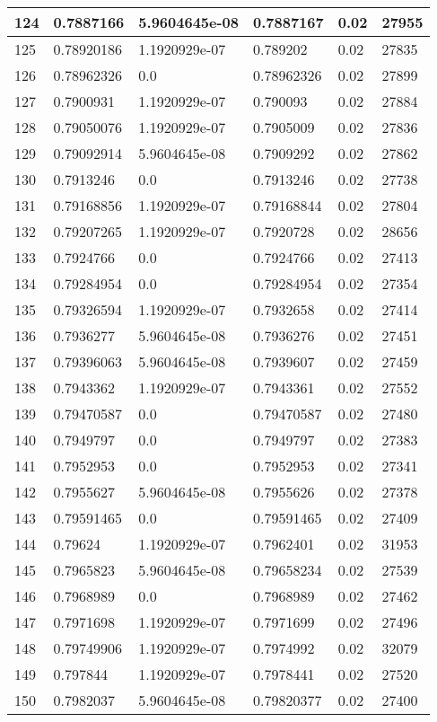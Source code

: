 \begin{longtable}{|l|l|l|l|l|l|}
124 & 0.7887166 & 5.9604645e-08 & 0.7887167 & 0.02 & 27955 \\ \hline 
125 & 0.78920186 & 1.1920929e-07 & 0.789202 & 0.02 & 27835 \\ \hline 
126 & 0.78962326 & 0.0 & 0.78962326 & 0.02 & 27899 \\ \hline 
127 & 0.7900931 & 1.1920929e-07 & 0.790093 & 0.02 & 27884 \\ \hline 
128 & 0.79050076 & 1.1920929e-07 & 0.7905009 & 0.02 & 27836 \\ \hline 
129 & 0.79092914 & 5.9604645e-08 & 0.7909292 & 0.02 & 27862 \\ \hline 
130 & 0.7913246 & 0.0 & 0.7913246 & 0.02 & 27738 \\ \hline 
131 & 0.79168856 & 1.1920929e-07 & 0.79168844 & 0.02 & 27804 \\ \hline 
132 & 0.79207265 & 1.1920929e-07 & 0.7920728 & 0.02 & 28656 \\ \hline 
133 & 0.7924766 & 0.0 & 0.7924766 & 0.02 & 27413 \\ \hline 
134 & 0.79284954 & 0.0 & 0.79284954 & 0.02 & 27354 \\ \hline 
135 & 0.79326594 & 1.1920929e-07 & 0.7932658 & 0.02 & 27414 \\ \hline 
136 & 0.7936277 & 5.9604645e-08 & 0.7936276 & 0.02 & 27451 \\ \hline 
137 & 0.79396063 & 5.9604645e-08 & 0.7939607 & 0.02 & 27459 \\ \hline 
138 & 0.7943362 & 1.1920929e-07 & 0.7943361 & 0.02 & 27552 \\ \hline 
139 & 0.79470587 & 0.0 & 0.79470587 & 0.02 & 27480 \\ \hline 
140 & 0.7949797 & 0.0 & 0.7949797 & 0.02 & 27383 \\ \hline 
141 & 0.7952953 & 0.0 & 0.7952953 & 0.02 & 27341 \\ \hline 
142 & 0.7955627 & 5.9604645e-08 & 0.7955626 & 0.02 & 27378 \\ \hline 
143 & 0.79591465 & 0.0 & 0.79591465 & 0.02 & 27409 \\ \hline 
144 & 0.79624 & 1.1920929e-07 & 0.7962401 & 0.02 & 31953 \\ \hline 
145 & 0.7965823 & 5.9604645e-08 & 0.79658234 & 0.02 & 27539 \\ \hline 
146 & 0.7968989 & 0.0 & 0.7968989 & 0.02 & 27462 \\ \hline 
147 & 0.7971698 & 1.1920929e-07 & 0.7971699 & 0.02 & 27496 \\ \hline 
148 & 0.79749906 & 1.1920929e-07 & 0.7974992 & 0.02 & 32079 \\ \hline 
149 & 0.797844 & 1.1920929e-07 & 0.7978441 & 0.02 & 27520 \\ \hline 
150 & 0.7982037 & 5.9604645e-08 & 0.79820377 & 0.02 & 27400 \\ \hline 
\end{longtable}